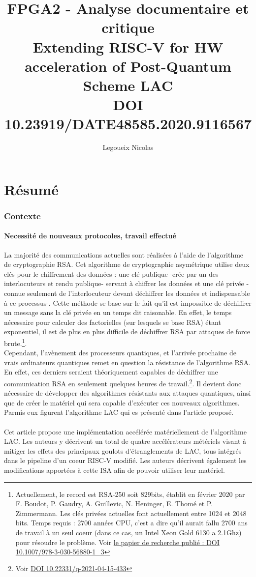 \documentclass[10pt,a4paper]{article}
\author{Legoueix Nicolas}
\title{FPGA2 - Analyse documentaire et critique \\ Extending RISC-V for HW acceleration of Post-Quantum Scheme LAC \\ DOI 10.23919/DATE48585.2020.9116567}
\begin{document}
\maketitle
\newpage
\part{Résumé}

\section{Contexte}
\subsection{Necessité de nouveaux protocoles, travail effectué}
La majorité des communications actuelles sont réalisées à l'aide de l'algorithme de cryptographie RSA. Cet algorithme de cryptographie asymétrique utilise deux clés pour le 
chiffrement des données : une clé publique -crée par un des interlocuteurs et rendu publique- servant à chiffrer les données et une clé privée -connue seulement de l'interlocuteur devant déchiffrer 
les données et indispensable à ce processus-. Cette méthode se base sur le fait qu'il est impossible de déchiffrer un message sans la clé privée en un temps dit raisonable. En effet, le temps nécessaire 
pour calculer des factorielles (sur lesquels se base RSA) étant exponentiel, il est de plus en plus difficile de déchiffrer RSA par attaques de force brute.\footnote{Actuellement, le record est RSA-250 soit 829bits, 
établit en février 2020 par F. Boudot, P. Gaudry, A. Guillevic, N. Heninger, E. Thomé et P. Zimmermann. Les clés privées actuelles font actuellement entre 1024 et 2048 bits. Temps requis : 
2700 années CPU, c'est a dire qu'il aurait fallu 2700 ans de travail à un seul coeur (dans ce cas, un Intel Xeon Gold 6130 a 2.1Ghz) pour résoudre le problème. Voir \href{https://eprint.iacr.org/2020/697.pdf}{le papier de recherche publié : DOI 10.1007/978-3-030-56880-1\_3} }.\\
Cependant, l'avènement des processeurs quantiques, et l'arrivée prochaine de vrais ordinateurs quantiques remet en question la résistance de l'algorithme RSA. En effet, ces derniers seraient théoriquement
capables de déchiffrer une communication RSA en seulement quelques heures de travail.\footnote{Voir \href{https://quantum-journal.org/papers/q-2021-04-15-433/pdf/}{DOI 10.22331/q-2021-04-15-433}}. Il devient donc nécessaire
de développer des algorithmes résistants aux attaques quantiques, ainsi que de créer le matériel qui sera capable d'exécuter ces nouveaux algorithmes. Parmis eux figurent l'algorithme LAC qui es présenté dans l'article proposé.\\~\\
Cet article propose une implémentation accélérée matériellement de l'algorithme LAC. Les auteurs y décrivent un total de quatre accélérateurs métériels visant à mitiger les effets des principaux goulots d'étranglements 
de LAC, tous intégrés dans le pipeline d'un coeur RISC-V modifié. Les auteurs décrivent également les modifications apportées à cette ISA afin de pouvoir utiliser leur matériel.
\end{document}
